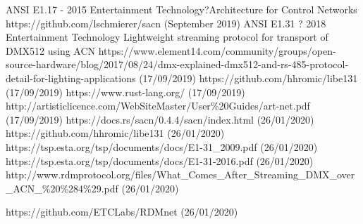 \documentclass[11pt,a4paper,notitlepage]{report}
\begin{document}
	\begin{thebibliography}{9}
		ANSI E1.17 - 2015 Entertainment Technology?Architecture for Control Networks
		https://github.com/lschmierer/sacn (September 2019)
		ANSI E1.31 ? 2018 Entertainment Technology Lightweight streaming protocol for transport of DMX512 using ACN
		https://www.element14.com/community/groups/open-source-hardware/blog/2017/08/24/dmx-explained-dmx512-and-rs-485-protocol-detail-for-lighting-applications (17/09/2019)
		https://github.com/hhromic/libe131 (17/09/2019)
		https://www.rust-lang.org/ (17/09/2019)
		http://artisticlicence.com/WebSiteMaster/User\%20Guides/art-net.pdf (17/09/2019)
		https://docs.rs/sacn/0.4.4/sacn/index.html
		(26/01/2020)
		https://github.com/hhromic/libe131
		(26/01/2020)
		https://tsp.esta.org/tsp/documents/docs/E1-31\_2009.pdf
		(26/01/2020)
		https://tsp.esta.org/tsp/documents/docs/E1-31-2016.pdf
		(26/01/2020)
		http://www.rdmprotocol.org/files/What\_Comes\_After\_Streaming\_DMX\_over\_ACN\_\%20\%284\%29.pdf (26/01/2020)
		
		https://github.com/ETCLabs/RDMnet (26/01/2020)
		
	\end{thebibliography}
	
\end{document}
